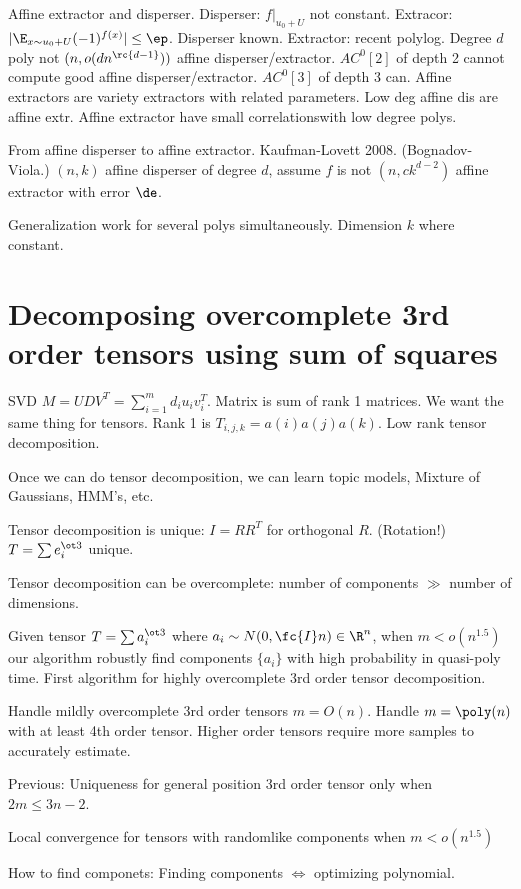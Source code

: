 Affine extractor and disperser. Disperser: $f|_{u_0+U}$ not constant. Extracor: $|\E_{x\sim u_0+U} (-1)^{f(x)}|\le \ep$.
Disperser known. Extractor: recent polylog.
Degree $d$ poly not $(n,o(dn^{\rc{d-1}}))$ affine disperser/extractor.
$AC^0[2]$ of depth 2 cannot compute good affine disperser/extractor. $AC^0[3]$ of depth 3 can. Affine extractors are variety extractors with related parameters.
Low deg affine dis are affine extr. Affine extractor have small correlationswith low degree polys.

From affine disperser to affine extractor. Kaufman-Lovett 2008. (Bognadov-Viola.)
$(n,k)$ affine disperser of degree $d$, assume $f$ is not $(n,ck^{d-2})$ affine extractor with error $\de$.

Generalization work for several polys simultaneously. Dimension $k$ where constant.

\section{Decomposing overcomplete 3rd order tensors using sum of squares}

SVD $M=UDV^T=\sum_{i=1}^m d_iu_iv_i^T$. Matrix is sum of rank 1 matrices.
We want the same thing for tensors. Rank 1 is $T_{i,j,k}=a(i)a(j)a(k)$. Low rank tensor decomposition.

Once we can do tensor decomposition, we can learn topic models, Mixture of Gaussians, HMM's, etc.

Tensor decomposition is unique: $I=RR^T$ for orthogonal $R$. (Rotation!) $T=\sum e_i^{\ot 3}$ unique.

Tensor decomposition can be overcomplete: number of components $\gg$ number of dimensions.

Given tensor $T=\sum a_i^{\ot 3}$ where $a_i\sim N(0,\fc{I}n)\in \R^n$, when $m<o(n^{1.5})$ our algorithm robustly find components $\{a_i\}$ with high probability in quasi-poly time. First algorithm for highly overcomplete 3rd order tensor decomposition.

Handle mildly overcomplete 3rd order tensors $m=O(n)$. Handle $m=\poly(n)$ with at least 4th order tensor. Higher order tensors require more samples to accurately estimate.

Previous:
Uniqueness for general position 3rd order tensor only when $2m\le 3n-2$.

Local convergence for tensors with randomlike components when $m<o(n^{1.5})$

How to find componets: Finding components $\iff$ optimizing polynomial.

